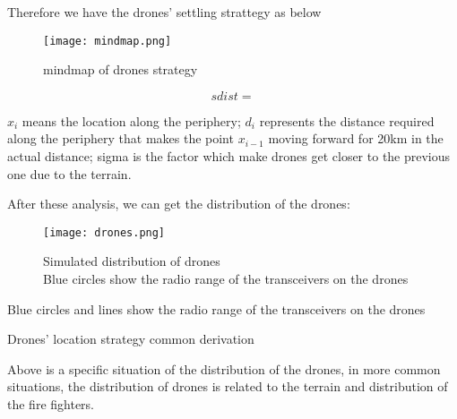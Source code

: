 \documentclass[../main]{subfiles}
\begin{document}
Therefore we have the drones' settling strattegy as below

\begin{figure}[h!]
      \centering
      \captionsetup{justification=centering}
      \texttt{[image: mindmap.png]}
      \caption{mindmap of drones strategy}
      \end{figure}
    
\begin{equation}
sdist=
\end{equation}

\(x_i\) means the location along the periphery; \(d_i\) represents the
distance required along the periphery that makes the point \(x_{i-1}\)
moving forward for 20km in the actual distance; sigma is the factor
which make drones get closer to the previous one due to the terrain.

After these analysis, we can get the distribution of the drones:

\begin{figure}[h!]
      \centering
      \captionsetup{justification=centering}
      \texttt{[image: drones.png]}
      \caption{Simulated distribution of drones \\ Blue circles show the radio range of the transceivers on the
drones}
      \end{figure}
      
Blue circles and lines show the radio range of the transceivers on the
drones

Drones' location strategy common derivation

Above is a specific situation of the distribution of the drones, in more
common situations, the distribution of drones is related to the terrain
and distribution of the fire fighters.
\end{document}
